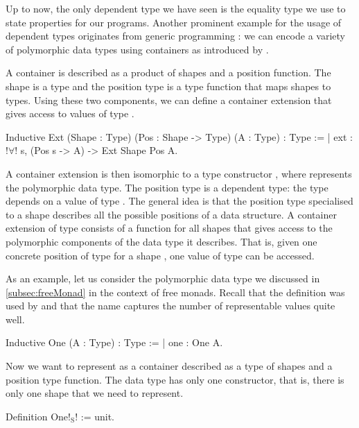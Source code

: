Up to now, the only dependent type we have seen is the equality type we use to state properties for our programs.
Another prominent example for the usage of dependent types originates from generic programming \citep{altenkirch2003generic,hinze2000new}: we can encode a variety of polymorphic data types using containers as introduced by \citet{abbott2003categories}.

A container is described as a product of shapes and a position function.
The shape is a type  and the position type  is a type function that maps shapes to types.
Using these two components, we can define a container extension that gives access to values of type .

\begin{coqcode}
Inductive Ext (Shape : Type) (Pos : Shape -> Type) (A : Type) : Type :=
| ext : !$\forall$! s, (Pos s -> A) -> Ext Shape Pos A.
\end{coqcode}

A container extension  is then isomorphic to a type constructor , where  represents the polymorphic data type.
The position type  is a dependent type: the type depends on a value of type .
The general idea is that the position type specialised to a shape  describes all the possible positions of a data structure.
A container extension of type  consists of a function  for all shapes  that gives access to the polymorphic components of the data type it describes.
That is, given one concrete position of type  for a shape , one value of type  can be accessed.

As an example, let us consider the polymorphic data type  we discussed in \autoref{subsec:freeMonad} in the context of free monads.
Recall that the definition was used by \citet{swierstra2008data} and that the name captures the number of representable values quite well.

\begin{coqcode}
Inductive One (A : Type) : Type :=
| one : One A.
\end{coqcode}

Now we want to represent  as a container described as a type of shapes and a position type function.
The data type  has only one constructor, that is, there is only one shape that we need to represent.

\begin{coqcode}
Definition One!$_\text{S}$! := unit.
\end{coqcode}

